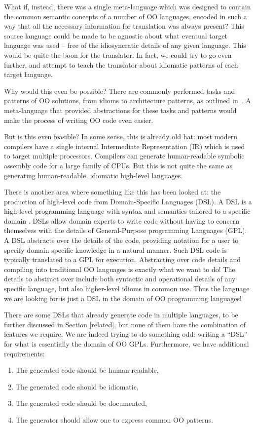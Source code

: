 \documentclass[sigplan,review,anonymous]{acmart}
\begin{document}
What if, instead, there was a single meta-language which was designed to
contain the common semantic concepts of a number of OO languages, encoded
in such a way that all the necessary information for translation was always
present?  This source language could be made to be agnostic about what
eventual target language was used -- free of the idiosyncratic details of
any given language.  This would be quite the boon for the translator.
In fact, we could try to go even further, and attempt to teach the translator
about idiomatic patterns of each target language.

Why would this even be possible? There are commonly performed tasks and
patterns of OO solutions, from idioms to architecture patterns, as outlined
in~\cite{gamma1995design}. A meta-language 
that provided abstractions for these tasks and patterns would make the process 
of writing OO code even easier.

But is this even feasible? In some sense, this is already old hat: most
modern compilers have a single internal Intermediate Representation (IR)
which is used to target multiple processors. Compilers can generate
human-readable symbolic assembly code for a large family of CPUs. But this
is not quite the same as generating human-readable, idiomatic high-level
languages.

There is another area where something like this has been looked at:
the production of high-level code from Domain-Specific Languages (DSL).
A DSL is a high-level programming language with syntax and semantics tailored
to a specific domain \cite{mernik2005and}. DSLs allow domain experts 
to write code without having to concern themselves with the details of
General-Purpose programming Languages (GPL). A DSL
abstracts over the details of the code, providing notation for a user to
specify domain-specific knowledge in a natural manner. Such DSL code is typically
translated to a GPL for execution. Abstracting over code details
and compiling into traditional OO languages is exactly what we want to do!
The details to abstract over include both syntactic and operational details of
any specific language, but also higher-level idioms in common use.  Thus
the language we are looking for
is just a DSL in the domain of OO programming languages!

There are some DSLs that already generate code in multiple languages, to be
further discussed in Section \ref{related}, but none of them have the 
combination of features we require. We are indeed trying to do something odd:
writing a ``DSL'' for what is essentially the domain of OO GPLs. Furthermore,
we have additional requirements:
\begin{enumerate}
\item The generated code should be human-readable,
\item The generated code should be idiomatic,
\item The generated code should be documented,
\item The generator should allow one to express common OO patterns.
\end{enumerate}
\end{document}
